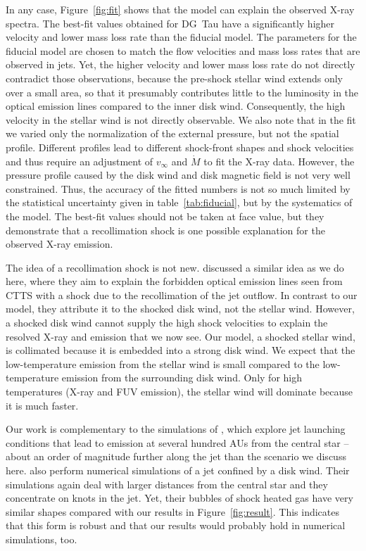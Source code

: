\documentclass{emulateapj}
\begin{document}
In any case, Figure~\ref{fig:fit} shows that the model can explain the observed X-ray spectra. The best-fit values obtained for DG~Tau have a significantly higher velocity and lower mass loss rate than the fiducial model. The parameters for the fiducial model are chosen to match the flow velocities and mass loss rates that are observed in jets. Yet, the higher velocity and lower mass loss rate do not directly contradict those observations, because the pre-shock stellar wind extends only over a small area, so that it presumably contributes little to the luminosity in the optical emission lines compared to the inner disk wind. Consequently, the high velocity in the stellar wind is not directly observable. We also note that in the fit we varied only the normalization of the external pressure, but not the spatial profile. Different profiles lead to different shock-front shapes and shock velocities and thus require an adjustment of $v_\infty$ and $\dot M$ to fit the X-ray data. However, the pressure profile caused by the disk wind and disk magnetic field is not very well constrained. Thus, the accuracy of the fitted numbers is not so much limited by the statistical uncertainty given in table~\ref{tab:fiducial}, but by the systematics of the model. The best-fit values should not be taken at face value, but they demonstrate that a recollimation shock is one possible explanation for the observed X-ray emission. 

The idea of a recollimation shock is not new.
\citet{1993ApJ...409..748G} discussed a similar idea as we do here, where they aim to explain the forbidden optical emission lines seen from CTTS with a shock due to the recollimation of the jet outflow. In contrast to our model, they attribute it to the shocked disk wind, not the stellar wind. However, a shocked disk wind cannot supply the high shock velocities to explain the resolved X-ray and  emission that we now see. Our model, a shocked stellar wind, is collimated because it is embedded into a strong disk wind. We expect that the low-temperature emission from the stellar wind is small compared to the low-temperature emission from the surrounding disk wind. Only for high temperatures (X-ray and FUV emission), the stellar wind will dominate because it is much faster.

Our work is complementary to the simulations of \citet{2010A&A...517A..68B,2010A&A...511A..42B,2011ApJ...737...54B}, which explore jet launching conditions that lead to emission at several hundred AUs from the central star -- about an order of magnitude further along the jet than the scenario we discuss here. \citet{2009A&A...502..217M,2012A&A...545A..53M} also perform numerical simulations of a jet confined by a disk wind. Their simulations again deal with larger distances from the central star and they concentrate on knots in the jet. Yet, their bubbles of shock heated gas have very similar shapes compared with our results in Figure~\ref{fig:result}. This indicates that this form is robust and that our results would probably hold in numerical simulations, too. 
\end{document}
